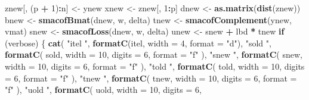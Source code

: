 \documentclass[
  12pt,
]{article}
\newenvironment{Shaded}{\begin{snugshade}}{\end{snugshade}}
\newcommand{\AttributeTok}[1]{\textcolor[rgb]{0.13,0.29,0.53}{#1}}
\newcommand{\ControlFlowTok}[1]{\textcolor[rgb]{0.13,0.29,0.53}{\textbf{#1}}}
\newcommand{\DecValTok}[1]{\textcolor[rgb]{0.00,0.00,0.81}{#1}}
\newcommand{\FunctionTok}[1]{\textcolor[rgb]{0.13,0.29,0.53}{\textbf{#1}}}
\newcommand{\NormalTok}[1]{#1}
\newcommand{\OtherTok}[1]{\textcolor[rgb]{0.56,0.35,0.01}{#1}}
\newcommand{\SpecialCharTok}[1]{\textcolor[rgb]{0.81,0.36,0.00}{\textbf{#1}}}
\newcommand{\StringTok}[1]{\textcolor[rgb]{0.31,0.60,0.02}{#1}}
\begin{document}
\begin{Shaded}
\begin{Highlighting}[]
\NormalTok{      znew[, (p }\SpecialCharTok{+} \DecValTok{1}\NormalTok{)}\SpecialCharTok{:}\NormalTok{n] }\OtherTok{\textless{}{-}}\NormalTok{ ynew}
\NormalTok{      xnew }\OtherTok{\textless{}{-}}\NormalTok{ znew[, }\DecValTok{1}\SpecialCharTok{:}\NormalTok{p]}
\NormalTok{      dnew }\OtherTok{\textless{}{-}} \FunctionTok{as.matrix}\NormalTok{(}\FunctionTok{dist}\NormalTok{(znew))}
\NormalTok{      bnew }\OtherTok{\textless{}{-}} \FunctionTok{smacofBmat}\NormalTok{(dnew, w, delta)}
\NormalTok{      tnew }\OtherTok{\textless{}{-}} \FunctionTok{smacofComplement}\NormalTok{(ynew, vmat)}
\NormalTok{      snew }\OtherTok{\textless{}{-}} \FunctionTok{smacofLoss}\NormalTok{(dnew, w, delta)}
\NormalTok{      unew }\OtherTok{\textless{}{-}}\NormalTok{ snew }\SpecialCharTok{+}\NormalTok{ lbd }\SpecialCharTok{*}\NormalTok{ tnew}
      \ControlFlowTok{if}\NormalTok{ (verbose) \{}
        \FunctionTok{cat}\NormalTok{(}
          \StringTok{"itel "}\NormalTok{,}
          \FunctionTok{formatC}\NormalTok{(itel, }\AttributeTok{width =} \DecValTok{4}\NormalTok{, }\AttributeTok{format =} \StringTok{"d"}\NormalTok{),}
          \StringTok{"sold "}\NormalTok{,}
          \FunctionTok{formatC}\NormalTok{(}
\NormalTok{            sold,}
            \AttributeTok{width =} \DecValTok{10}\NormalTok{,}
            \AttributeTok{digits =} \DecValTok{6}\NormalTok{,}
            \AttributeTok{format =} \StringTok{"f"}
\NormalTok{          ),}
          \StringTok{"snew "}\NormalTok{,}
          \FunctionTok{formatC}\NormalTok{(}
\NormalTok{            snew,}
            \AttributeTok{width =} \DecValTok{10}\NormalTok{,}
            \AttributeTok{digits =} \DecValTok{6}\NormalTok{,}
            \AttributeTok{format =} \StringTok{"f"}
\NormalTok{          ),}
          \StringTok{"told "}\NormalTok{,}
          \FunctionTok{formatC}\NormalTok{(}
\NormalTok{            told,}
            \AttributeTok{width =} \DecValTok{10}\NormalTok{,}
            \AttributeTok{digits =} \DecValTok{6}\NormalTok{,}
            \AttributeTok{format =} \StringTok{"f"}
\NormalTok{          ),}
          \StringTok{"tnew "}\NormalTok{,}
          \FunctionTok{formatC}\NormalTok{(}
\NormalTok{            tnew,}
            \AttributeTok{width =} \DecValTok{10}\NormalTok{,}
            \AttributeTok{digits =} \DecValTok{6}\NormalTok{,}
            \AttributeTok{format =} \StringTok{"f"}
\NormalTok{          ),}
          \StringTok{"uold "}\NormalTok{,}
          \FunctionTok{formatC}\NormalTok{(}
\NormalTok{            uold,}
            \AttributeTok{width =} \DecValTok{10}\NormalTok{,}
            \AttributeTok{digits =} \DecValTok{6}\NormalTok{,}

\end{Highlighting}
\end{Shaded}
\end{document}
